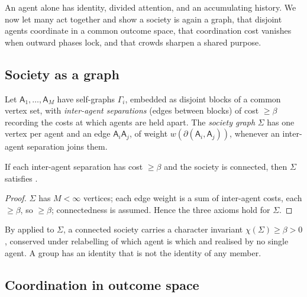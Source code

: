 \documentclass[11pt,twocolumn,a4paper]{article}
\newcommand{\Agent}{\mathsf{A}}
\newcommand{\Self}{\Gamma}          %
\newcommand{\wt}{w}
\newcommand{\floorc}{\beta}          %
\newcommand{\cut}{\partial}
\newcommand{\Char}{\chi}             %
\newcommand{\Soc}{\Sigma}            %
\begin{document}
An agent alone has identity, divided attention, and an accumulating
history. We now let many act together and show a society is again a
graph, that disjoint agents coordinate in a common outcome space, that
coordination cost vanishes when outward phases lock, and that crowds
sharpen a shared purpose.

\subsection{Society as a graph}

\begin{definition}
\label{def:society}
Let $\Agent_1,\dots,\Agent_M$ have self-graphs $\Self_i$, embedded as
disjoint blocks of a common vertex set, with \emph{inter-agent
separations} (edges between blocks) of cost $\ge\floorc$ recording the
costs at which agents are held apart. The \emph{society graph} $\Soc$ has
one vertex per agent and an edge $\Agent_i\Agent_j$, of weight
$\wt(\cut(\Agent_i,\Agent_j))$, whenever an inter-agent separation joins
them.
\end{definition}

\begin{lemma}
\label{lem:society-graph}
If each inter-agent separation has cost $\ge\floorc$ and the society is
connected, then $\Soc$ satisfies .
\end{lemma}

\begin{proof}
$\Soc$ has $M<\infty$ vertices; each edge weight is a sum of inter-agent
costs, each $\ge\floorc$, so $\ge\floorc$; connectedness is assumed. Hence
the three axioms hold for $\Soc$.
\end{proof}

\begin{corollary}
\label{cor:society-identity}
By  applied to $\Soc$, a connected society carries a
character invariant $\Char(\Soc)\ge\floorc>0$, conserved under relabelling
of which agent is which and realised by no single agent. A group has an
identity that is not the identity of any member.
\end{corollary}

\subsection{Coordination in outcome space}
\end{document}
